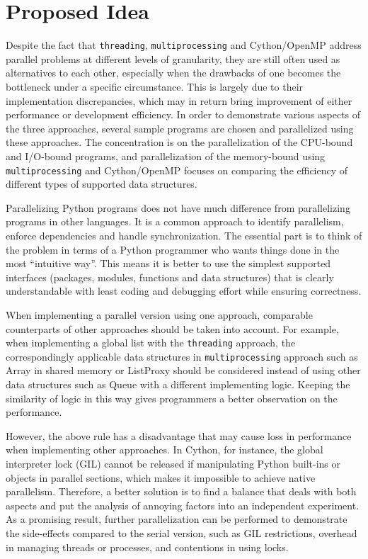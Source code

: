 \documentclass[letterpaper,twocolumn,10pt]{article}
\begin{document}
\section{Proposed Idea}

Despite the fact that \verb#threading#, \verb#multiprocessing# and Cython/OpenMP address parallel problems at different levels of granularity, they are still often used as alternatives to each other, especially when the drawbacks of one becomes the bottleneck under a specific circumstance. This is largely due to their implementation discrepancies, which may in return bring improvement of either performance or development efficiency. In order to demonstrate various aspects of the three approaches, several sample programs are chosen and parallelized using these approaches. The concentration is on the parallelization of the CPU-bound and I/O-bound programs, and parallelization of the memory-bound using \verb#multiprocessing# and Cython/OpenMP focuses on comparing the efficiency of different types of supported data structures.

Parallelizing Python programs does not have much difference from parallelizing programs in other languages. It is a common approach to identify parallelism, enforce dependencies and handle synchronization. The essential part is to think of the problem in terms of a Python programmer who wants things done in the most ``intuitive way''. This means it is better to use the simplest supported interfaces (packages, modules, functions and data structures) that is clearly understandable with least coding and debugging effort while ensuring correctness. 

When implementing a parallel version using one approach, comparable counterparts of other approaches should be taken into account. For example, when implementing a global list with the \verb#threading# approach, the correspondingly applicable data structures  in \verb#multiprocessing# approach such as Array in shared memory or ListProxy should be considered instead of using other data structures such as Queue with a different implementing logic. Keeping the similarity of logic in this way gives programmers a better observation on the performance.

However, the above rule has a disadvantage that may cause loss in performance when implementing other approaches. In Cython, for instance, the global interpreter lock (GIL) cannot be released if manipulating Python built-ins or objects in parallel sections, which makes it impossible to achieve native parallelism. Therefore, a better solution is to find a balance that deals with both aspects and put the analysis of annoying factors into an independent experiment. As a promising result, further parallelization can be performed to demonstrate the side-effects compared to the serial version, such as GIL restrictions, overhead in managing threads or processes, and contentions in using locks.
\end{document}

